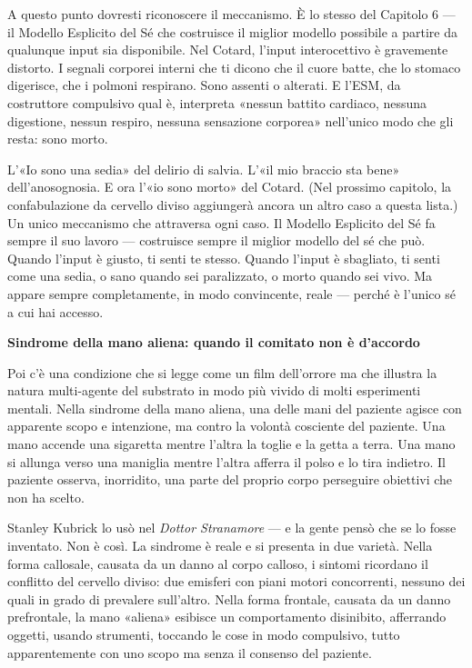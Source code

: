\documentclass[11pt, twoside, openright]{book}
\begin{document}
A questo punto dovresti riconoscere il meccanismo. È lo stesso del Capitolo 6 --- il Modello Esplicito del Sé che costruisce il miglior modello possibile a partire da qualunque input sia disponibile. Nel Cotard, l'input interocettivo è gravemente distorto. I segnali corporei interni che ti dicono che il cuore batte, che lo stomaco digerisce, che i polmoni respirano. Sono assenti o alterati. E l'ESM, da costruttore compulsivo qual è, interpreta «nessun battito cardiaco, nessuna digestione, nessun respiro, nessuna sensazione corporea» nell'unico modo che gli resta: sono morto.

L'«Io sono una sedia» del delirio di salvia. L'«il mio braccio sta bene» dell'anosognosia. E ora l'«io sono morto» del Cotard. (Nel prossimo capitolo, la confabulazione da cervello diviso aggiungerà ancora un altro caso a questa lista.) Un unico meccanismo che attraversa ogni caso. Il Modello Esplicito del Sé fa sempre il suo lavoro --- costruisce sempre il miglior modello del sé che può. Quando l'input è giusto, ti senti te stesso. Quando l'input è sbagliato, ti senti come una sedia, o sano quando sei paralizzato, o morto quando sei vivo. Ma appare sempre completamente, in modo convincente, reale --- perché è l'unico sé a cui hai accesso.

\textbf{Sindrome della mano aliena: quando il comitato non è d'accordo}

Poi c'è una condizione che si legge come un film dell'orrore ma che illustra la natura multi-agente del substrato in modo più vivido di molti esperimenti mentali. Nella sindrome della mano aliena, una delle mani del paziente agisce con apparente scopo e intenzione, ma contro la volontà cosciente del paziente. Una mano accende una sigaretta mentre l'altra la toglie e la getta a terra. Una mano si allunga verso una maniglia mentre l'altra afferra il polso e lo tira indietro. Il paziente osserva, inorridito, una parte del proprio corpo perseguire obiettivi che non ha scelto.

Stanley Kubrick lo usò nel \textit{Dottor Stranamore} --- e la gente pensò che se lo fosse inventato. Non è così. La sindrome è reale e si presenta in due varietà. Nella forma callosale, causata da un danno al corpo calloso, i sintomi ricordano il conflitto del cervello diviso: due emisferi con piani motori concorrenti, nessuno dei quali in grado di prevalere sull'altro. Nella forma frontale, causata da un danno prefrontale, la mano «aliena» esibisce un comportamento disinibito, afferrando oggetti, usando strumenti, toccando le cose in modo compulsivo, tutto apparentemente con uno scopo ma senza il consenso del paziente.
\end{document}
